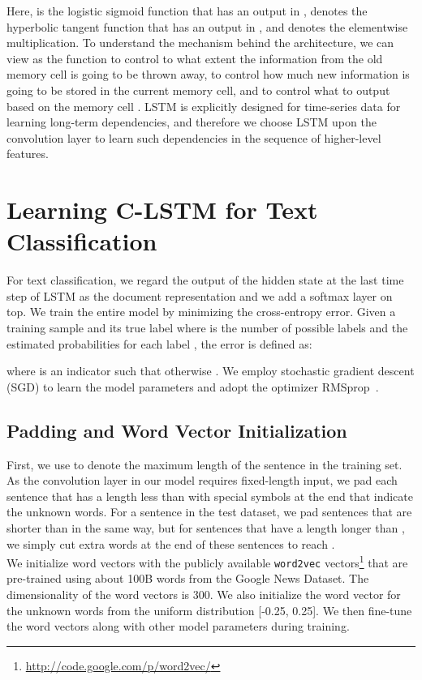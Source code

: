 \documentclass[11pt,letterpaper]{article}
\begin{document}
Here,  is the logistic sigmoid function that has an output in
,  denotes the hyperbolic tangent function that has an
output in , and  denotes the elementwise multiplication.
To understand the mechanism behind the architecture, we can view
 as the function to control to
what extent the information from the old memory cell is going to be
thrown away,  to control how much new information is going to be
stored in the current memory cell, and  to control what to output
based on the memory cell . LSTM is explicitly designed for
time-series data for learning long-term dependencies, and therefore we choose
LSTM upon the convolution layer to learn such dependencies in the
sequence of higher-level features.
\section{Learning C-LSTM for Text Classification}
For text classification, we regard the output of the hidden state at the
last time step of LSTM as the document representation and we add a
softmax layer on top. We train the entire model by minimizing
the cross-entropy error. Given a training sample  and
its true label  where  is the number
of possible labels and the estimated probabilities
 for each label , the error is defined as:

where  is an indicator such that  otherwise .
We employ stochastic gradient descent (SGD) to learn the model
parameters and adopt the optimizer RMSprop~\cite{rmsprop}.

\subsection{Padding and Word Vector Initialization} First, we use
 to denote the maximum length of the sentence in the training
set. As the
convolution layer in our model requires fixed-length input, we pad
each sentence that has a length less than  with special symbols
at the end that indicate the unknown words. For a sentence in the test
dataset, we pad sentences that are shorter than  in the same
way, but for sentences that have a length longer than , we
simply cut extra words at the end of these sentences to reach .\\
\indent We initialize word vectors with the publicly available
\texttt{word2vec} vectors\footnote{\url{http://code.google.com/p/word2vec/}}
that are pre-trained
using about 100B words from the Google News Dataset. The dimensionality of
the word vectors is 300. We also initialize the word vector for the unknown
words from the uniform distribution [-0.25, 0.25]. We then fine-tune the word
vectors along with other model parameters during training.
\end{document}
